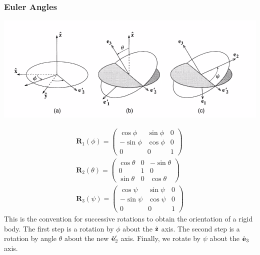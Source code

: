 \documentclass[../PHYS306Notes.tex]{subfiles}
\begin{document}
\subsubsection{Euler Angles}
\begin{center}
    \includegraphics[scale=00.7]{Lecture-34/l34-img6.png}
\end{center}
\[
\begin{array}{c}
\mathbf{R}_{1}(\phi)=\left(\begin{array}{ccc}
\cos \phi & \sin \phi & 0 \\
-\sin \phi & \cos \phi & 0 \\
0 & 0 & 1
\end{array}\right) \\
\mathbf{R}_{2}(\theta)=\left(\begin{array}{ccc}
\cos \theta & 0 & -\sin \theta \\
0 & 1 & 0 \\
\sin \theta & 0 & \cos \theta
\end{array}\right) \\
\mathbf{R}_{3}(\psi)=\left(\begin{array}{ccc}
\cos \psi & \sin \psi & 0 \\
-\sin \psi & \cos \psi & 0 \\
0 & 0 & 1
\end{array}\right)
\end{array}
\]
This is the convention for successive rotations to obtain the orientation of a rigid body. The first step is a rotation by $\phi$ about the $\hat{\mathbf{z}}$ axis. The second step is a rotation by angle $\theta$ about the new $\hat{\mathbf{e}}'_2$ axis. Finally, we rotate by $\psi$ about the $\hat{\mathbf{e}}_3$ axis. 
\end{document}
